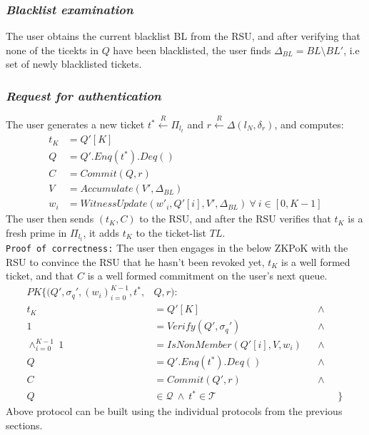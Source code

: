 \documentclass[12pt]{article}
\newcommand{\rIn}{\xleftarrow{R}}
\begin{document}
\subsubsection*{\textit{Blacklist examination}}\vspace*{-2mm}
The user obtains the current blacklist BL from the RSU, and after verifying that none of the ticekts in $Q$ have been blacklisted, the user finds $\Delta_{BL} = BL \setminus BL'$, i.e set of newly blacklisted tickets.\\


\subsubsection*{\textit{Request for authentication}}\vspace*{-2mm}
The user generates a new ticket $t^* \rIn \Pi_{l_t}$ and $r \rIn \Delta(l_N, \delta_r)$, and computes: \vspace*{-7mm}
\begin{align}
	t_K &= Q'[K] \\
	Q &= Q'.Enq(t^*).Deq() \\
	C &= Commit(Q, r) \\
	V &= Accumulate(V', \Delta_{BL}) \\
	w_i &= WitnessUpdate(w'_i, Q'[i], V', \Delta_{BL}) \ \forall \ i \in [0, K-1]
\end{align}
The user then sends $(t_K, C)$ to the RSU, and after the RSU verifies that $t_K$ is a fresh prime in $\Pi_{l_t}$, it adds $t_K$ to the ticket-list $TL$.\\

\texttt{Proof of correctness:} The user then engages in the below ZKPoK with the RSU to convince the RSU that he hasn't been revoked yet, $t_K$ is a well formed ticket, and that $C$ is a well formed commitment on the user's next queue.
\begin{align}
	PK \lbrace (Q', \sigma_q', (w_i)_{i=0}^{K-1}, t^*, &Q, r):\nonumber\\ 
	t_K &= Q'[K] &&\land\qquad\nonumber\\ 
	1 &= Verify(Q', \sigma_q') &&\land\qquad\nonumber\\ 
	\land_{i=0}^{K-1}\ 1 &= IsNonMember(Q'[i], V, w_i) &&\land\qquad\nonumber\\ 
	Q &= Q'.Enq(t^*).Deq() &&\land\qquad\nonumber\\ 
	C &= Commit(Q', r) &&\land\qquad\nonumber\\ 
	Q &\in \mathcal{Q} \ \land\ t^* \in \mathcal{T} &&\qquad\rbrace
\end{align}
Above protocol can be built using the individual protocols from the previous sections. 
\end{document}
